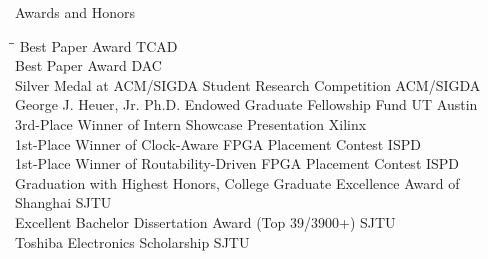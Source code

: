 
\begin{rSection}{Awards and Honors}
\begin{tabbing}
\hspace{5.50in}\= \hspace{1.00in}\= \kill
Best Paper Award \> TCAD  \\
Best Paper Award \> DAC  \\
Silver Medal at ACM/SIGDA Student Research Competition \> ACM/SIGDA  \\
George J. Heuer, Jr. Ph.D. Endowed Graduate Fellowship Fund \> UT Austin  \\
3rd-Place Winner of Intern Showcase Presentation \> Xilinx  \\
1st-Place Winner of Clock-Aware FPGA Placement Contest \> ISPD  \\
1st-Place Winner of Routability-Driven FPGA Placement Contest \> ISPD  \\
Graduation with Highest Honors, College Graduate Excellence Award of Shanghai \> SJTU  \\
Excellent Bachelor Dissertation Award (Top 39/3900+) \> SJTU  \\
Toshiba Electronics Scholarship \> SJTU  \\

\end{tabbing}
\end{rSection}

